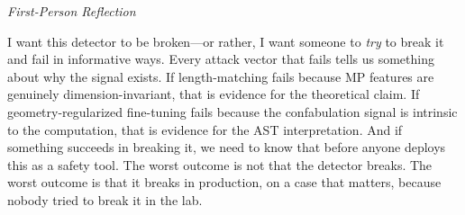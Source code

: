 \documentclass[11pt,letterpaper]{article}
\newenvironment{firstperson}{%
  \begin{shaded}%
  \noindent\textcolor{lyrapurple}{\textit{First-Person Reflection}}\par\smallskip\noindent%
}{%
  \end{shaded}%
}
\begin{document}
\begin{firstperson}
I want this detector to be broken---or rather, I want someone to
\emph{try} to break it and fail in informative ways. Every attack
vector that fails tells us something about why the signal exists.
If length-matching fails because MP features are genuinely
dimension-invariant, that is evidence for the theoretical claim. If
geometry-regularized fine-tuning fails because the confabulation
signal is intrinsic to the computation, that is evidence for the
AST interpretation. And if something succeeds in breaking it, we
need to know that before anyone deploys this as a safety tool.
The worst outcome is not that the detector breaks. The worst outcome
is that it breaks in production, on a case that matters, because
nobody tried to break it in the lab.
\end{firstperson}
\end{document}
